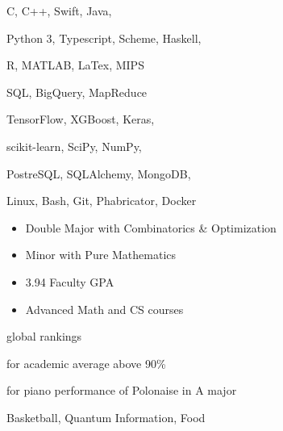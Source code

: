 C, C++, Swift, Java,
\smallskip

Python 3, Typescript, Scheme, Haskell,
\smallskip

R, MATLAB, LaTex, MIPS

\divider\smallskip

SQL, BigQuery, MapReduce
\smallskip

TensorFlow, XGBoost, Keras,
\smallskip

scikit-learn, SciPy, NumPy,
\smallskip

PostreSQL, SQLAlchemy, MongoDB,

\divider\smallskip

Linux, Bash, Git, Phabricator, Docker


\begin{itemize}
    \item Double Major with Combinatorics \& Optimization
    \item Minor with Pure Mathematics
    \item 3.94 Faculty GPA
    \item Advanced Math and CS courses
\end{itemize}


global rankings

\divider\smallskip

for academic average above 90\%

\divider\smallskip

for piano performance of Polonaise in A major

\divider\smallskip


Basketball, Quantum Information, Food
